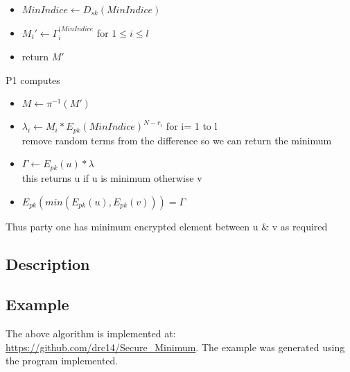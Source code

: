 \documentclass[10pt]{article} %
\begin{document}
\begin{itemize}
	\item $MinIndice \gets D_{sk}(MinIndice)$
	\item $M_i' \gets \Gamma_i^{(MinIndice}$ for $1\le i \le l$
	\item return $M'$
\end{itemize}

P1 computes

\begin{itemize}
\item $M \gets \pi^{-1}(M')$
\item $\lambda _i \gets M_i * E_{pk}(MinIndice)^{N-r_i}$ for i= 1 to l
\\remove random terms from the difference so we can return the minimum
\item $\Gamma \gets E_{pk}(u)*\lambda$
\\this returns u if u is minimum otherwise v
\item $E_{pk}(min(E_{pk}(u),E_{pk}(v))) = \Gamma$
\end{itemize}

Thus party one has minimum encrypted element between u \& v as required
\subsection*{\textbf{Description}}

\subsection*{\textbf{Example}}
The above algorithm is implemented at: \url{https://github.com/drc14/Secure_Minimum}. The example was generated using the program implemented.
\end{document}
